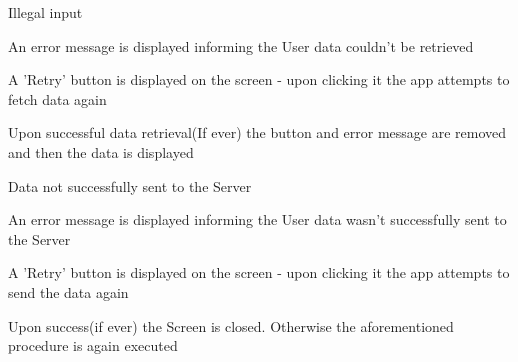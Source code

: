 \begin{packed_item}
\begin{packed_item}
\begin{packed_enum}
\begin{packed_enum}
								\item[0.a] Illegal input
								\item[] \begin{packed_enum}
									\item An error message is displayed informing the User data couldn't be retrieved
									\item A 'Retry' button is displayed on the screen - upon clicking it the app attempts to fetch data again
									\item Upon successful data retrieval(If ever) the button and error message are removed and then the data is displayed
								\end{packed_enum}
							
								\item[1.a] Data not successfully sent to the Server
								\item[] \begin{packed_enum}
									\item An error message is displayed informing the User data wasn't successfully sent to the Server
									\item A 'Retry' button is displayed on the screen - upon clicking it the app attempts to send the data again
									\item Upon success(if ever) the Screen is closed. Otherwise the aforementioned procedure is again executed
								\end{packed_enum}
							
							\end{packed_enum}
						\end{packed_enum}
					\end{packed_item}
				\end{packed_item}
			
